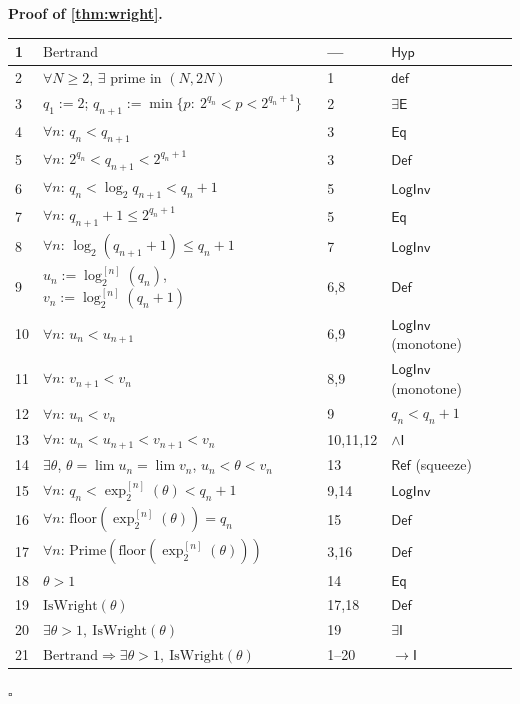 \documentclass[11pt,reqno]{amsart}
\theoremstyle{blueplain}
\renewcommand{\qedsymbol}{\textcolor{proofqed}{\ensuremath{\square}}}
\renewenvironment{proof}[1][Proof]{\par\noindent\textbf{\textcolor{proofhead}{#1.}}\par\nobreak}{\par\nobreak\hfill\qedsymbol}
\numberwithin{equation}{section}
\begin{document}
\begin{proof}[\textbf{Proof of \cref{thm:wright}}]
	\label{proof:wright}
	{\scriptsize
		\begin{tabular}{|m{0.7cm}|m{12cm}|m{1.4cm}|m{2.5cm}|}
			\hline
			1 & $\text{Bertrand}$ & --- & $\mathsf{Hyp}$ \\ \hline
			2 & $\forall N\ge 2$, $\exists$ prime in $(N,2N)$ & 1 & $\mathsf{def}$ \\ \hline
			3 & $q_1:=2$; $q_{n+1}:=\min\{p:\ 2^{q_n}<p<2^{q_n+1}\}$ & 2 & $\exists\mathsf{E}$ \\ \hline
			4 & $\forall n$: $q_n<q_{n+1}$ & 3 & $\mathsf{Eq}$ \\ \hline
			5 & $\forall n$: $2^{q_n}<q_{n+1}<2^{q_n+1}$ & 3 & $\mathsf{Def}$ \\ \hline
			6 & $\forall n$: $q_n<\log_2 q_{n+1}<q_n+1$ & 5 & $\mathsf{LogInv}$ \\ \hline
			7 & $\forall n$: $q_{n+1}+1\le 2^{q_n+1}$ & 5 & $\mathsf{Eq}$ \\ \hline
			8 & $\forall n$: $\log_2(q_{n+1}+1)\le q_n+1$ & 7 & $\mathsf{LogInv}$ \\ \hline
			9 & $u_n:=\log_2^{[n]}(q_n)$, $v_n:=\log_2^{[n]}(q_n+1)$ & 6,8 & $\mathsf{Def}$ \\ \hline
			10 & $\forall n$: $u_n<u_{n+1}$ & 6,9 & $\mathsf{LogInv}$ (monotone) \\ \hline
			11 & $\forall n$: $v_{n+1}<v_n$ & 8,9 & $\mathsf{LogInv}$ (monotone) \\ \hline
			12 & $\forall n$: $u_n<v_n$ & 9 & $q_n<q_n+1$ \\ \hline
			13 & $\forall n$: $u_n<u_{n+1}<v_{n+1}<v_n$ & 10,11,12 & $\wedge\mathsf{I}$ \\ \hline
			14 & $\exists\theta$, $\theta=\lim u_n=\lim v_n$, $u_n<\theta<v_n$ & 13 & $\mathsf{Ref}$ (squeeze) \\ \hline
			15 & $\forall n$: $q_n<\exp_2^{[n]}(\theta)<q_n+1$ & 9,14 & $\mathsf{LogInv}$ \\ \hline
			16 & $\forall n$: $\mathrm{floor}(\exp_2^{[n]}(\theta))=q_n$ & 15 & $\mathsf{Def}$ \\ \hline
			17 & $\forall n$: $\mathrm{Prime}(\mathrm{floor}(\exp_2^{[n]}(\theta)))$ & 3,16 & $\mathsf{Def}$ \\ \hline
			18 & $\theta>1$ & 14 & $\mathsf{Eq}$ \\ \hline
			19 & $\mathrm{IsWright}(\theta)$ & 17,18 & $\mathsf{Def}$ \\ \hline
			20 & $\exists\theta>1,\ \mathrm{IsWright}(\theta)$ & 19 & $\exists\mathsf{I}$ \\ \hline
			21 & $\text{Bertrand}\Rightarrow\exists\theta>1,\ \mathrm{IsWright}(\theta)$ & 1--20 & $\rightarrow\mathsf{I}$ \\ \hline
		\end{tabular}
	}
\end{proof}
\end{document}
